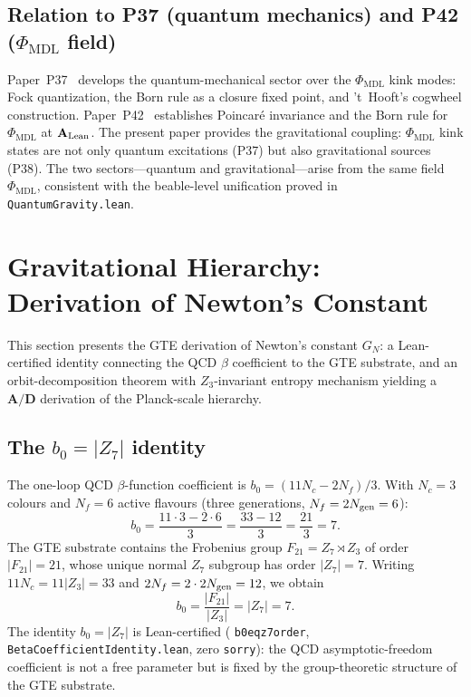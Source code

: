 \documentclass[11pt]{article}
\theoremstyle{remark}
\newcommand{\PHIMDL}{\Phi_{\mathrm{MDL}}}
\newcommand{\lean}[1]{%
  \penalty-100
  \begingroup\def\_{\textunderscore\allowbreak}\texttt{#1}\endgroup}
\newcommand{\CatAL}{\ensuremath{\textbf{A}_{\rm Lean}}}
\newcommand{\CatAD}{\textbf{A/D}}
\newcommand{\GN}{G_N}
\begin{document}
\subsection{Relation to P37 (quantum mechanics) and P42 ($\PHIMDL$ field)}

Paper~P37~\cite{SpivackQMFromR110} develops the quantum-mechanical sector over the
$\PHIMDL$ kink modes: Fock quantization, the Born rule as a closure fixed point,
and 't~Hooft's cogwheel construction.
Paper~P42~\cite{SpivackPhiMDLField} establishes Poincar\'e invariance and the Born
rule for $\PHIMDL$ at $\CatAL$.
The present paper provides the gravitational coupling: $\PHIMDL$ kink states are
not only quantum excitations (P37) but also gravitational sources (P38).
The two sectors---quantum and gravitational---arise from the same field $\PHIMDL$,
consistent with the beable-level unification proved in \lean{QuantumGravity.lean}.

\section{Gravitational Hierarchy: Derivation of Newton's Constant}
\label{sec:hierarchy}

This section presents the GTE derivation of Newton's constant $\GN$:
a Lean-certified identity connecting the QCD $\beta$ coefficient to the GTE
substrate, and an orbit-decomposition theorem with $Z_3$-invariant entropy
mechanism yielding a $\CatAD$ derivation of the Planck-scale hierarchy.

\subsection{The $b_0 = |Z_7|$ identity}

The one-loop QCD $\beta$-function coefficient is $b_0 = (11N_c - 2N_f)/3$.
With $N_c = 3$ colours and $N_f = 6$ active flavours (three generations,
$N_f = 2N_{\rm gen} = 6$):
\[
  b_0 = \frac{11 \cdot 3 - 2 \cdot 6}{3} = \frac{33 - 12}{3} = \frac{21}{3} = 7.
\]
The GTE substrate contains the Frobenius group
$F_{21} = Z_7 \rtimes Z_3$ of order $|F_{21}| = 21$,
whose unique normal $Z_7$ subgroup has order $|Z_7| = 7$.
Writing $11N_c = 11|Z_3| = 33$ and $2N_f = 2 \cdot 2N_{\rm gen} = 12$, we obtain
\[
  b_0 = \frac{|F_{21}|}{|Z_3|} = |Z_7| = 7.
\]
The identity $b_0 = |Z_7|$ is Lean-certified (\lean{b0\_eq\_z7\_order},
\lean{BetaCoefficientIdentity.lean}, zero \texttt{sorry}):
the QCD asymptotic-freedom coefficient is not a free parameter but is fixed by the
group-theoretic structure of the GTE substrate.
\end{document}

